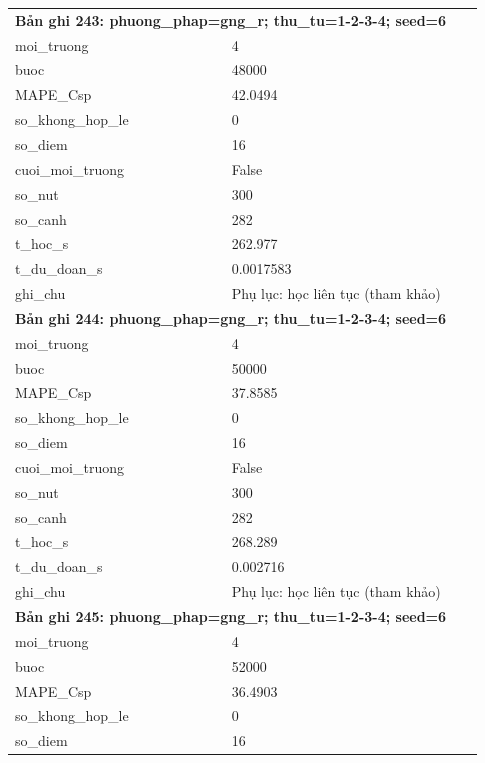 \begin{longtable}{p{0.43\linewidth}p{0.50\linewidth}}
\midrule
\multicolumn{2}{p{0.95\linewidth}}{\textbf{Bản ghi 243: phuong\_phap=gng\_r; thu\_tu=1-2-3-4; seed=6}} \\
moi\_\allowbreak truong & 4 \\
buoc & 48000 \\
MAPE\_\allowbreak Csp & 42.0494 \\
so\_\allowbreak khong\_\allowbreak hop\_\allowbreak le & 0 \\
so\_\allowbreak diem & 16 \\
cuoi\_\allowbreak moi\_\allowbreak truong & False \\
so\_\allowbreak nut & 300 \\
so\_\allowbreak canh & 282 \\
t\_\allowbreak hoc\_\allowbreak s & 262.977 \\
t\_\allowbreak du\_\allowbreak doan\_\allowbreak s & 0.0017583 \\
ghi\_\allowbreak chu & Phụ lục: học liên tục (tham khảo) \\
\midrule
\multicolumn{2}{p{0.95\linewidth}}{\textbf{Bản ghi 244: phuong\_phap=gng\_r; thu\_tu=1-2-3-4; seed=6}} \\
moi\_\allowbreak truong & 4 \\
buoc & 50000 \\
MAPE\_\allowbreak Csp & 37.8585 \\
so\_\allowbreak khong\_\allowbreak hop\_\allowbreak le & 0 \\
so\_\allowbreak diem & 16 \\
cuoi\_\allowbreak moi\_\allowbreak truong & False \\
so\_\allowbreak nut & 300 \\
so\_\allowbreak canh & 282 \\
t\_\allowbreak hoc\_\allowbreak s & 268.289 \\
t\_\allowbreak du\_\allowbreak doan\_\allowbreak s & 0.002716 \\
ghi\_\allowbreak chu & Phụ lục: học liên tục (tham khảo) \\
\midrule
\multicolumn{2}{p{0.95\linewidth}}{\textbf{Bản ghi 245: phuong\_phap=gng\_r; thu\_tu=1-2-3-4; seed=6}} \\
moi\_\allowbreak truong & 4 \\
buoc & 52000 \\
MAPE\_\allowbreak Csp & 36.4903 \\
so\_\allowbreak khong\_\allowbreak hop\_\allowbreak le & 0 \\
so\_\allowbreak diem & 16 \\

\end{longtable}
